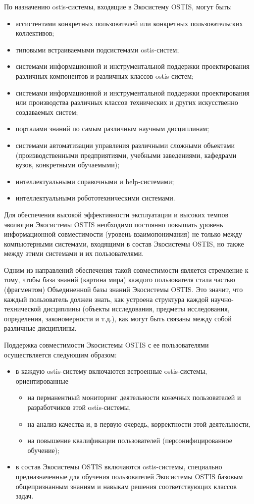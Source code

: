 По назначению ostis-системы, входящие в Экосистему OSTIS, могут быть:
\begin{itemize}
    \item ассистентами конкретных пользователей или конкретных пользовательских коллективов;
    \item типовыми встраиваемыми подсистемами ostis-систем;
    \item системами информационной и инструментальной поддержки проектирования различных компонентов и различных классов ostis-систем;
    \item системами информационной и инструментальной поддержки проектирования или производства различных классов технических и других искусственно создаваемых систем;
    \item порталами знаний по самым различным научным дисциплинам;
    \item системами автоматизации управления различными сложными объектами (производственными предприятиями, учебными заведениями, кафедрами вузов, конкретными обучаемыми);
    \item интеллектуальными справочными и help-системами;
    \item интеллектуальными робототехническими системами.
\end{itemize}

Для обеспечения высокой эффективности эксплуатации и высоких темпов эволюции Экосистемы OSTIS необходимо постоянно повышать уровень информационной совместимости (уровень взаимопонимания) не только между компьютерными системами, входящими в состав Экосистемы OSTIS, но также между этими системами и их пользователями. 

Одним из направлений обеспечения такой совместимости является стремление к тому, чтобы база знаний (картина мира) каждого пользователя стала частью (фрагментом) Объединенной базы знаний Экосистемы OSTIS. 
Это значит, что каждый пользователь должен знать, как устроена структура каждой научно-технической дисциплины (объекты исследования, предметы исследования, определения, закономерности и т.д.), как могут быть связаны между собой различные дисциплины.

Поддержка совместимости Экосистемы OSTIS с ее пользователями осуществляется следующим образом:
\begin{itemize}
    \item в каждую ostis-систему включаются встроенные ostis-системы, ориентированные
    \begin{itemize}
        \item на перманентный мониторинг деятельности конечных пользователей и разработчиков этой ostis-системы,
        \item на анализ качества и, в первую очередь, корректности этой деятельности,
        \item на повышение квалификации пользователей (персонифицированное обучение);
    \end{itemize}
    \item в состав Экосистемы OSTIS включаются ostis-системы, специально предназначенные для обучения пользователей Экосистемы OSTIS базовым общепризнанным знаниям и навыкам решения соответствующих классов задач.
\end{itemize}

